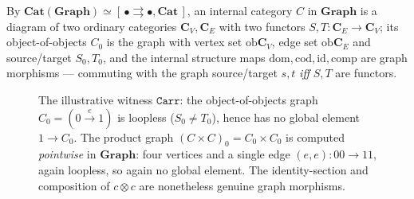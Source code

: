 \documentclass[11pt]{amsart}
\theoremstyle{plain}
\theoremstyle{definition}
\theoremstyle{remark}
\newcommand{\Cat}{\mathbf{Cat}}
\newcommand{\Graph}{\mathbf{Graph}}
\newcommand{\id}{\mathrm{id}}
\newcommand{\dom}{\mathrm{dom}}
\newcommand{\cod}{\mathrm{cod}}
\newcommand{\comp}{\mathrm{comp}}
\newcommand{\ob}{\mathrm{ob}}
\begin{document}
By $\Cat(\Graph)\simeq[\,\bullet\rightrightarrows\bullet,\Cat\,]$, an internal category $C$ in
$\Graph$ is a diagram of two ordinary categories $\mathbf{C}_V,\mathbf{C}_E$ with two functors
$S,T:\mathbf{C}_E\to\mathbf{C}_V$; its object-of-objects $C_0$ is the graph with vertex set
$\ob\mathbf{C}_V$, edge set $\ob\mathbf{C}_E$ and source/target $S_0,T_0$, and the internal structure
maps $\dom,\cod,\id,\comp$ are graph morphisms --- commuting with the graph source/target $s,t$
\emph{iff} $S,T$ are functors.

\begin{figure}[h]
\centering
{}
\caption{The illustrative witness $\mathtt{Carr}$: the object-of-objects graph $C_0=(0\xrightarrow{e}1)$
is loopless ($S_0\neq T_0$), hence has no global element $1\to C_0$. The product graph
$(C\times C)_0=C_0\times C_0$ is computed \emph{pointwise} in $\Graph$: four vertices and a single edge
$(e,e):00\to11$, again loopless, so again no global element. The identity-section and composition of
$c\otimes c$ are nonetheless genuine graph morphisms.}
\label{fig:graph}
\end{figure}
\end{document}
